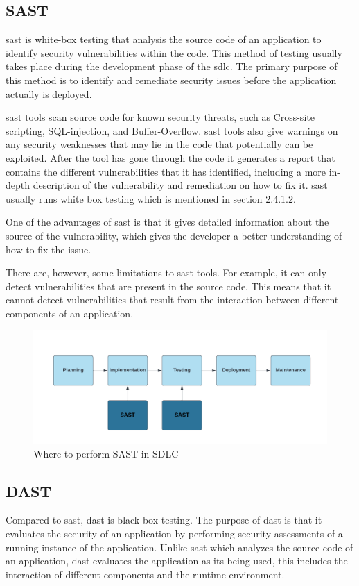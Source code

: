 \subsection{SAST}
\acrlong{sast} is white-box testing that analysis the source code of an application to identify security vulnerabilities within the code. This method of testing usually takes place during the development phase of the \acrlong{sdlc}. The primary purpose of this method is to identify and remediate security issues before the application actually is deployed. \cite{sast}

\acrshort{sast} tools scan source code for known security threats, such as \gls{Cross-site scripting}, \gls{SQL-injection}, and \gls{Buffer-Overflow}. \acrshort{sast} tools also give warnings on any security weaknesses that may lie in the code that potentially can be exploited. After the tool has gone through the code it generates a report that contains the different vulnerabilities that it has identified, including a more in-depth description of the vulnerability and remediation on how to fix it. \acrshort{sast} usually runs white box testing  which is mentioned in section 2.4.1.2. 

One of the advantages of \acrshort{sast} is that it gives detailed information about the source of the vulnerability, which gives the developer a better understanding of how to fix the issue. 

There are, however, some limitations to \acrshort{sast} tools. For example, it can only detect vulnerabilities that are present in the source code. This means that it cannot detect vulnerabilities that result from the interaction between different components of an application.
\\
\begin{figure}[H]
    \centering
    \includegraphics[width=0.8\columnwidth]{Images/sast.png}
    \caption{Where to perform SAST in SDLC}
    \label{fig: Performance of SAST in SDLC}
\end{figure}


\subsection{DAST}
Compared to \acrshort{sast}, \acrlong{dast} is black-box testing. The purpose of \acrshort{dast} is that it evaluates the security of an application by performing security assessments of a running instance of the application. Unlike \acrshort{sast} which analyzes the source code of an application, \acrshort{dast} evaluates the application as its being used, this includes the interaction of different components and the runtime environment. 


